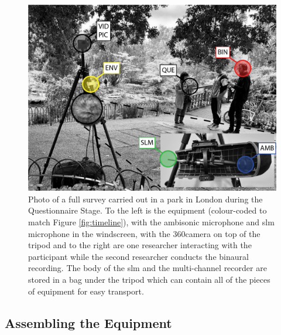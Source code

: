  \begin{figure}
   \centering
   \includegraphics[width=\textwidth]{Figures/RegentsParkSurvey_V2-2}
   \caption{Photo of a full survey carried out in a park in London during the Questionnaire Stage. To the left is the equipment (colour-coded to match Figure \ref{fig:timeline}), with the ambisonic microphone and \gls{slm} microphone in the windscreen, with the 360\degree camera on top of the tripod and to the right are one researcher interacting with the participant while the second researcher conducts the binaural recording. The body of the \gls{slm} and the multi-channel recorder are stored in a bag under the tripod which can contain all of the pieces of equipment for easy transport.}
   \label{fig:survey-pic}
 \end{figure}

 \subsection{Assembling the Equipment}

